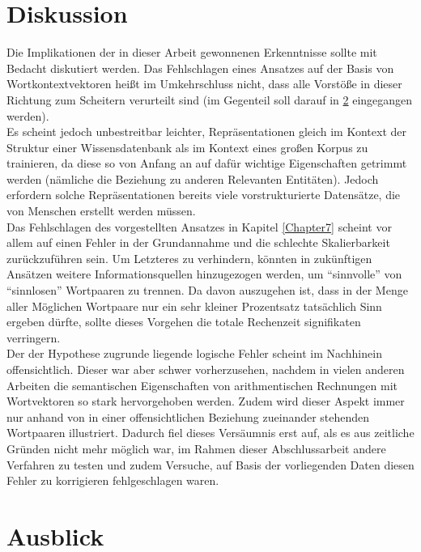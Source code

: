\section{Diskussion}

Die Implikationen der in dieser Arbeit gewonnenen Erkenntnisse sollte mit Bedacht diskutiert werden. Das Fehlschlagen
eines Ansatzes auf der Basis von Wortkontextvektoren heißt im Umkehrschluss nicht, dass alle Vorstöße in dieser
Richtung zum Scheitern verurteilt sind (im Gegenteil soll darauf in \ref{sec:fazit-ausblick} eingegangen werden).\\
Es scheint jedoch unbestreitbar leichter, Repräsentationen gleich im Kontext der Struktur einer Wissensdatenbank als im
Kontext eines großen Korpus zu trainieren, da diese so von Anfang an auf dafür wichtige Eigenschaften getrimmt werden
(nämliche die Beziehung zu anderen Relevanten Entitäten). Jedoch erfordern solche Repräsentationen bereits viele
vorstrukturierte Datensätze, die von Menschen erstellt werden müssen.\\

Das Fehlschlagen des vorgestellten Ansatzes in Kapitel \ref{Chapter7} scheint vor allem auf einen Fehler in der
Grundannahme und die schlechte Skalierbarkeit zurückzuführen sein. Um Letzteres zu verhindern, könnten in zukünftigen Ansätzen
weitere Informationsquellen hinzugezogen werden, um ``sinnvolle'' von ``sinnlosen'' Wortpaaren zu trennen. Da davon
auszugehen ist, dass in der Menge aller Möglichen Wortpaare nur ein sehr kleiner Prozentsatz tatsächlich Sinn ergeben
dürfte, sollte dieses Vorgehen die totale Rechenzeit signifikaten verringern.\\
Der der Hypothese zugrunde liegende logische Fehler scheint im Nachhinein offensichtlich. Dieser war aber schwer
vorherzusehen, nachdem in vielen anderen Arbeiten die semantischen Eigenschaften von arithmentischen Rechnungen mit
Wortvektoren so stark hervorgehoben werden. Zudem wird dieser Aspekt immer nur anhand von in einer offensichtlichen
Beziehung zueinander stehenden Wortpaaren illustriert. Dadurch fiel dieses Versäumnis erst auf, als es aus zeitliche Gründen
nicht mehr möglich war, im Rahmen dieser Abschlussarbeit andere Verfahren zu testen und zudem Versuche, auf Basis der
vorliegenden Daten diesen Fehler zu korrigieren fehlgeschlagen waren.

\section{Ausblick}\label{sec:fazit-ausblick}


